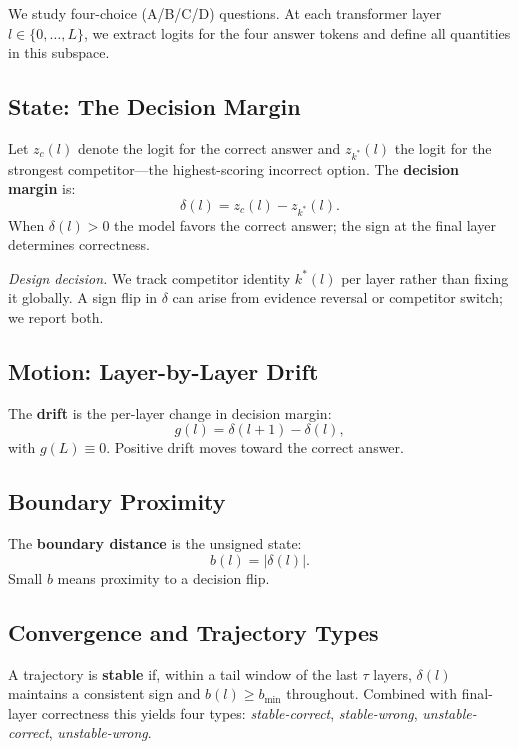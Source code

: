 \documentclass{article}
\begin{document}
We study four-choice (A/B/C/D) questions.  At each transformer layer $l \in \{0,\ldots,L\}$, we extract logits for the four answer tokens and define all quantities in this subspace.

\subsection{State: The Decision Margin}

Let $z_c(l)$ denote the logit for the correct answer and $z_{k^*}(l)$ the logit for the strongest competitor---the highest-scoring incorrect option.  The \textbf{decision margin} is:
\begin{equation}
  \delta(l) = z_c(l) - z_{k^*}(l).
  \label{eq:delta}
\end{equation}
When $\delta(l) > 0$ the model favors the correct answer; the sign at the final layer determines correctness.

\emph{Design decision.}  We track competitor identity $k^*(l)$ per layer rather than fixing it globally.  A sign flip in $\delta$ can arise from evidence reversal or competitor switch; we report both.

\subsection{Motion: Layer-by-Layer Drift}

The \textbf{drift} is the per-layer change in decision margin:
\begin{equation}
  g(l) = \delta(l{+}1) - \delta(l),
  \label{eq:drift}
\end{equation}
with $g(L) \equiv 0$.  Positive drift moves toward the correct answer.

\subsection{Boundary Proximity}

The \textbf{boundary distance} is the unsigned state:
\begin{equation}
  b(l) = |\delta(l)|.
  \label{eq:boundary}
\end{equation}
Small $b$ means proximity to a decision flip.

\subsection{Convergence and Trajectory Types}

A trajectory is \textbf{stable} if, within a tail window of the last $\tau$ layers, $\delta(l)$ maintains a consistent sign and $b(l) \geq b_{\min}$ throughout.  Combined with final-layer correctness this yields four types: \emph{stable-correct}, \emph{stable-wrong}, \emph{unstable-correct}, \emph{unstable-wrong}.
\end{document}
